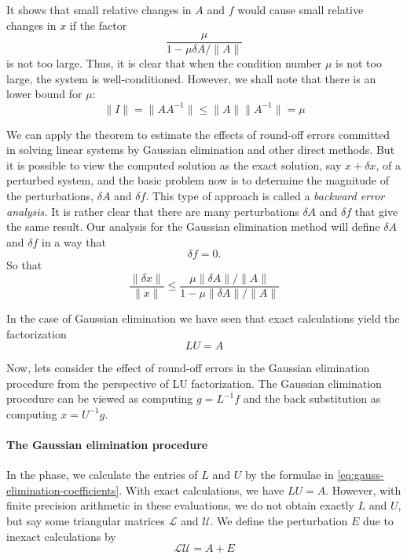 \documentclass[../main.tex]{subfiles}
\begin{document}
It shows that small relative changes in $A$ and $f$ would cause small relative changes in $x$ if the factor
\begin{equation*}
	\frac{\mu}{1 - \mu \delta A / \| A \|}
\end{equation*}
is not too large. Thus, it is clear that when the condition number $\mu$ is not too large, the system is well-conditioned. However, we shall note that there is an lower bound for $\mu$:
\begin{equation*}
	\| I \| = \| A A^{-1} \| \leq \| A \| \| A^{-1} \| = \mu
\end{equation*}

We can apply the theorem to estimate the effects of round-off errors committed in solving linear systems by Gaussian elimination and other direct methods. But it is possible to view the computed solution as the exact solution, say $x + \delta x$, of a perturbed system, and the basic problem now is to determine the magnitude of the perturbations, $\delta A$ and $\delta f$. This type of approach is called a \emph{backward error analysis.} It is rather clear that there are many perturbations $\delta A$ and $\delta f$ that give the same result. Our analysis for the Gaussian elimination method will define $\delta A$ and $\delta f$ in a way that
\begin{equation*}
	\delta f = 0.
\end{equation*}
So that
\begin{equation*}
	\frac{\| \delta x \|}{\| x \|} \leq \frac{\mu \| \delta A \| / \| A \|}{1 - \mu \| \delta A \| / \| A \|}
\end{equation*}

In the case of Gaussian elimination we have seen that exact calculations yield the factorization
\begin{equation*}
	L U = A
\end{equation*}

Now, lets consider the effect of round-off errors in the Gaussian elimination procedure from the perspective of LU factorization. The Gaussian elimination procedure can be viewed as computing $g = L^{-1} f$ and the back substitution as computing $x = U^{-1} g$.

\paragraph{The Gaussian elimination procedure} In the phase, we calculate the entries of $L$ and $U$ by the formulae in \eqref{eq:gauss-elimination-coefficients}. With exact calculations, we have $L U = A$. However, with finite precision arithmetic in these evaluations, we do not obtain exactly $L$ and $U$, but say some triangular matrices $\mathcal{L}$ and $\mathcal{U}$. We define the perturbation $E$ due to inexact calculations by
\begin{equation*}
	\mathcal{L} \mathcal{U} = A + E
\end{equation*}
\end{document}
